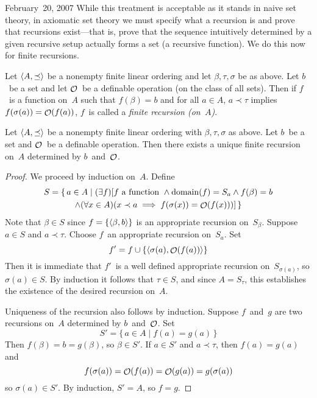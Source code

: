 \begin{lecture}{February~20, 2007}
While this treatment is acceptable as it stands in naive set theory, in axiomatic set theory we must specify what a recursion is and prove that recursions exist---that is, prove that the sequence intuitively determined by a given recursive setup actually forms a set (a recursive function). We do this now for finite recursions.
\begin{defn}
Let \(\langle{A},{\preceq}\rangle\) be a nonempty finite linear ordering and let \(\beta,\tau,\sigma\) be as above. Let \(b\)~be a set and let \(\mathop{\mathcal{O}}\nolimits\)~be a definable operation (on the class of all sets). Then if \(f\)~is a function on~\(A\) such that \(f(\beta)=b\) and for all \(a\in A\), \(a\prec\tau\) implies \(f(\sigma(a))=\mathop{\mathcal{O}}\nolimits(f(a))\), \(f\)~is called a \emph{finite recursion (on~\(A\))}.
\end{defn}
\begin{thm}
Let \(\langle{A},{\preceq}\rangle\) be a nonempty finite linear ordering with \(\beta,\tau,\sigma\) as above. Let \(b\)~be a set and \(\mathop{\mathcal{O}}\nolimits\)~be a definable operation. Then there exists a unique finite recursion on~\(A\) determined by \(b\)~and~\(\mathop{\mathcal{O}}\nolimits\).
\end{thm}
\begin{proof}
We proceed by induction on~\(A\). Define
\begin{multline*}
S=\{\,a\in A\mid(\exists f)[f\text{ a function }\land \operatorname{domain}(f)=S_a\land f(\beta)=b\\
	\land(\forall x\in A)(x\prec a\implies f(\sigma(x))=\mathop{\mathcal{O}}\nolimits(f(x)))]\,\}
\end{multline*}
Note that \(\beta\in S\) since \(f=\{\langle{\beta},{b}\rangle\}\) is an appropriate recursion on~\(S_{\beta}\). Suppose \(a\in S\) and \(a\prec\tau\). Choose \(f\)~an appropriate recursion on~\(S_a\). Set
\[f'=f\cup\{\langle{\sigma(a)},{\mathop{\mathcal{O}}\nolimits(f(a))}\rangle\}\]
Then it is immediate that \(f'\)~is a well defined appropriate recursion on~\(S_{\sigma(a)}\), so \(\sigma(a)\in S\). By induction it follows that \(\tau\in S\), and since \(A=S_{\tau}\), this establishes the existence of the desired recursion on~\(A\).

Uniqueness of the recursion also follows by induction. Suppose \(f\)~and~\(g\) are two recursions on~\(A\) determined by \(b\)~and~\(\mathop{\mathcal{O}}\nolimits\). Set
\[S'=\{\,a\in A\mid f(a)=g(a)\,\}\]
Then \(f(\beta)=b=g(\beta)\), so \(\beta\in S'\). If \(a\in S'\) and \(a\prec\tau\), then \(f(a)=g(a)\) and
\[f(\sigma(a))=\mathop{\mathcal{O}}\nolimits(f(a))=\mathop{\mathcal{O}}\nolimits(g(a))=g(\sigma(a))\]
so \(\sigma(a)\in S'\). By induction, \(S'=A\), so \(f=g\).
\end{proof}


\end{lecture}
